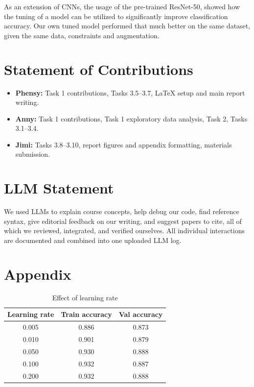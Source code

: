 \documentclass[11pt]{article}
\begin{document}
As an extension of CNNs, the usage of the pre-trained ResNet-50, showed how the tuning of a model can be utilized to significantly improve classification accuracy. Our own tuned model performed that much better on the same dataset, given the same data, constraints and augmentation.




\section*{Statement of Contributions}
\begin{itemize}
  \item \textbf{Phensy:} Task 1 contributions, Tasks 3.5--3.7, LaTeX setup and main report writing.
  \item \textbf{Anny:} Task 1 contributions, Task 1 exploratory data analysis, Task 2, Tasks 3.1--3.4.
  \item \textbf{Jimi:} Tasks 3.8--3.10, report figures and appendix formatting, materials submission.
\end{itemize} 

\section*{LLM Statement}
We used LLMs to explain course concepts, help debug our code, find reference syntax, 
give editorial feedback on our writing, and suggest papers to cite, all of which we reviewed, 
integrated, and verified ourselves. All individual interactions are documented and combined into one uploaded LLM log.





\section*{Appendix}


\begin{table}[htbp]
  \centering
  \caption{Effect of learning rate}
  \label{tab:mlp-lr}
  \begin{tabular}{ccc}
    \toprule
    Learning rate & Train accuracy & Val accuracy \\
    \midrule
    0.005 & 0.886 & 0.873 \\
    0.010 & 0.901 & 0.879 \\
    0.050 & 0.930 & 0.888 \\
    0.100 & 0.932 & 0.887 \\
    0.200 & 0.932 & 0.888 \\
    \bottomrule
  \end{tabular}
\end{table}
\end{document}
